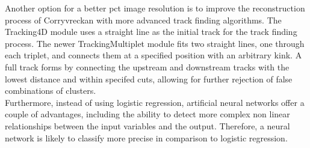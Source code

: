 Another option for a better pct image resolution is to improve the reconstruction process of Corryvreckan with more advanced track finding algorithms.
The Tracking4D module uses a straight line as the initial track for
the track finding process. The newer TrackingMultiplet module fits two straight lines, one through each triplet, and connects them at a specified position with an arbitrary kink.
A full track forms by connecting the upstream and downstream tracks with the lowest distance and within specifed cuts, allowing for further rejection of false combinations
of clusters. \\
Furthermore, instead of using logistic regression, artificial neural networks \cite{ann}\cite{neural} offer a couple of advantages,
including the ability to detect more complex non linear relationships between the input variables and the output. Therefore, a neural network is likely to classify
more precise in comparison to logistic regression.
